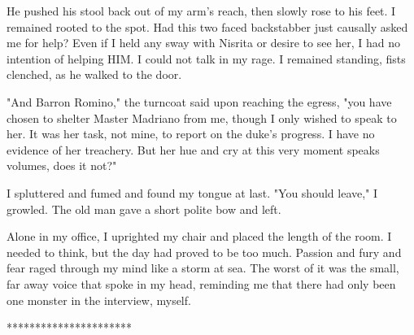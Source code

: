 \documentclass{article}
\begin{document}
He pushed his stool back out of my arm's reach, then slowly rose to his feet. I remained rooted to the spot. Had this two faced backstabber just causally asked me for help? Even if I held any sway with Nisrita or desire to see her, I had no intention of helping HIM. I could not talk in my rage. I remained standing, fists clenched, as he walked to the door.

"And Barron Romino," the turncoat said upon reaching the egress, "you have chosen to shelter Master Madriano from me, though I only wished to speak to her. It was her task, not mine, to report on the duke's progress. I have no evidence of her treachery. But her hue and cry at this very moment speaks volumes, does it not?"

I spluttered and fumed and found my tongue at last. "You should leave," I growled. The old man gave a short polite bow and left.

Alone in my office, I uprighted my chair and placed the length of the room. I needed to think, but the day had proved to be too much. Passion and fury and fear raged through my mind like a storm at sea. The worst of it was the small, far away voice that spoke in my head, reminding me that there had only been one monster in the interview, myself.

**********************
\end{document}
